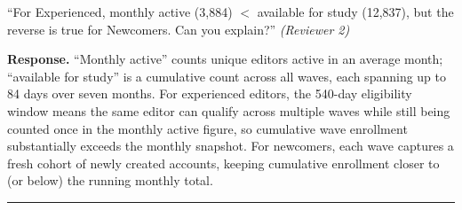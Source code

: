 \documentclass[12pt]{article}
\newenvironment{reviewquote}{%
  \def\FrameCommand{{\color{quotebarcolor}\vrule width 2pt}\colorbox{quotebg}}%
  \MakeFramed{\advance\hsize-\width \FrameRestore}%
  \small
}{%
  \endMakeFramed
}
\begin{document}
\begin{reviewquote}
``For Experienced, monthly active (3,884) $<$ available for study (12,837), but the reverse is true for Newcomers. Can you explain?'' \textit{(Reviewer 2)}
\end{reviewquote}

\textbf{Response.} ``Monthly active'' counts unique editors active in an average month; ``available for study'' is a cumulative count across all waves, each spanning up to 84 days over seven months. For experienced editors, the 540-day eligibility window means the same editor can qualify across multiple waves while still being counted once in the monthly active figure, so cumulative wave enrollment substantially exceeds the monthly snapshot. For newcomers, each wave captures a fresh cohort of newly created accounts, keeping cumulative enrollment closer to (or below) the running monthly total.

\bigskip\hrule\bigskip
\end{document}
